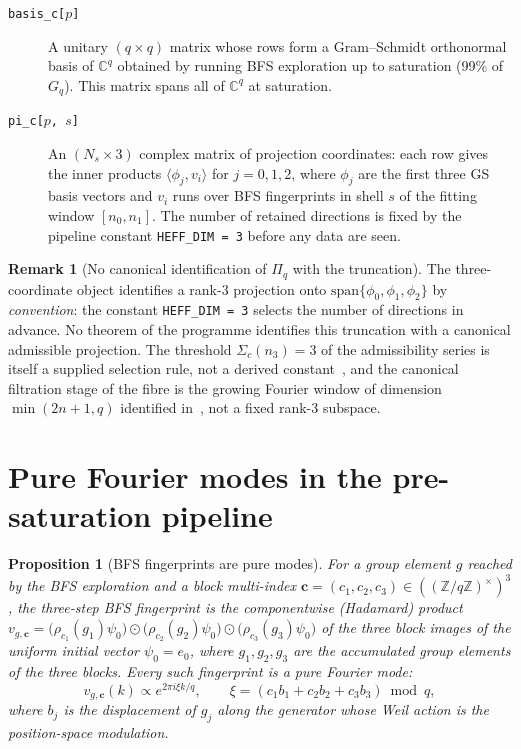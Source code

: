 \documentclass[11pt,a4paper]{article}
\theoremstyle{plain}
\newtheorem{proposition}[theorem]{Proposition}
\theoremstyle{definition}
\newtheorem{remark}[theorem]{Remark}
\newcommand{\Z}{\mathbb{Z}}
\newcommand{\C}{\mathbb{C}}
\newcommand{\Piq}{\Pi_q}
\newcommand{\exi}[1]{e_{#1}}
\begin{document}
    \begin{description}
      \item[\texttt{basis\_c[$p$]}] A unitary $(q \times q)$ matrix whose rows
      form a Gram--Schmidt orthonormal basis of $\C^q$ obtained by running
      BFS exploration up to saturation (99\% of $G_q$).
      This matrix spans all of $\C^q$ at saturation.

      \item[\texttt{pi\_c[$p$, $s$]}] An $(N_s \times 3)$ complex matrix of
      projection coordinates: each row gives the
      inner products $\langle \phi_j, v_i\rangle$ for $j = 0,1,2$, where
      $\phi_j$ are the first three GS basis vectors and $v_i$ runs over BFS
      fingerprints in shell $s$ of the fitting window $[n_0, n_1]$.
      The number of retained directions is fixed by the pipeline constant
      \texttt{HEFF\_DIM = 3} before any data are seen.
    \end{description}

    \begin{remark}[No canonical identification of $\Piq$ with the truncation]
      \label{rem:no-identification}
      The three-coordinate object identifies a rank-3 projection onto
      $\mathrm{span}\{\phi_0, \phi_1, \phi_2\}$ by \emph{convention}: the constant
      \texttt{HEFF\_DIM = 3} selects the number of directions in advance.
      No theorem of the programme identifies this truncation with a canonical admissible
      projection.
      The threshold $\Sigma_c(n_3) = 3$ of the admissibility series is itself a supplied
      selection rule, not a derived constant~\cite{Beau2026a27}, and the canonical
      filtration stage of the fibre is the growing Fourier window of
      dimension $\min(2n+1,q)$ identified in~\cite{Beau2026q5a}, not a fixed rank-3
      subspace.
    \end{remark}

  \section{Pure Fourier modes in the pre-saturation pipeline}
  \label{sec:purity}

  \begin{proposition}[BFS fingerprints are pure modes]
    \label{prop:fingerprint-purity}
    For a group element $g$ reached by the BFS exploration and a block multi-index
    $\mathbf{c} = (c_1, c_2, c_3) \in ((\Z/q\Z)^{\times})^3$, the \emph{three-step BFS
    fingerprint} is the componentwise (Hadamard) product
    $v_{g,\mathbf{c}} = \bigl(\rho_{c_1}(g_1)\psi_0\bigr) \odot
    \bigl(\rho_{c_2}(g_2)\psi_0\bigr) \odot \bigl(\rho_{c_3}(g_3)\psi_0\bigr)$ of the
    three block images of the uniform initial vector $\psi_0 = \exi{0}$, where
    $g_1, g_2, g_3$ are the accumulated group elements of the three blocks.
    Every such fingerprint is a pure Fourier mode:
    \[
      v_{g,\mathbf{c}}(k) \propto e^{2\pi i \xi k/q},
      \qquad \xi = (c_1 b_1 + c_2 b_2 + c_3 b_3) \bmod q,
    \]
    where $b_j$ is the displacement of $g_j$ along the generator whose Weil action is the
    position-space modulation.
  \end{proposition}
\end{document}

